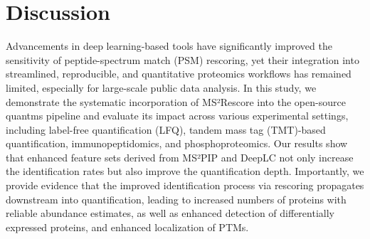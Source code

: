 \documentclass[12pt]{article}
\begin{document}
\section{Discussion}
Advancements in deep learning-based tools have significantly improved the sensitivity of peptide-spectrum match (PSM) rescoring, yet their integration into streamlined, reproducible, and quantitative %
proteomics workflows has remained limited, especially for large-scale public data analysis. In this study, we demonstrate the systematic incorporation of MS²Rescore into the open-source quantms pipeline and evaluate its impact across various experimental settings, including label-free quantification (LFQ), tandem mass tag (TMT)-based quantification, immunopeptidomics, and phosphoproteomics. Our results show that enhanced feature sets derived from MS²PIP and DeepLC not only increase the identification rates but also improve the quantification depth. Importantly, we provide evidence that the improved identification process via rescoring propagates downstream into quantification, leading to increased numbers of proteins with reliable abundance estimates, as well as enhanced detection of differentially expressed proteins, and enhanced localization of PTMs. %
\end{document}

